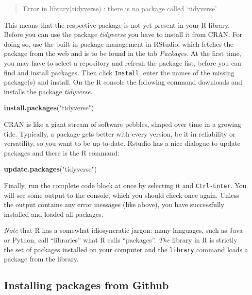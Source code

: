 \documentclass[]{svmono}
\newenvironment{Shaded}{\begin{snugshade}}{\end{snugshade}}
\newcommand{\KeywordTok}[1]{\textcolor[rgb]{0.13,0.29,0.53}{\textbf{#1}}}
\newcommand{\StringTok}[1]{\textcolor[rgb]{0.31,0.60,0.02}{#1}}
\newcommand{\NormalTok}[1]{#1}
\theoremstyle{definition}
\theoremstyle{definition}
\theoremstyle{definition}
\theoremstyle{remark}
\begin{document}
\begin{quote}
Error in library(tidyverse) : there is no package called `tidyverse'
\end{quote}

This means that the respective package is not yet present in your R
library. Before you can use the package \emph{tidyverse} you have to
install it from CRAN. For doing so, use the built-in package management
in RStudio, which fetches the package from the web and is to be found in
the tab \emph{Packages}. At the first time, you may have to select a
repository and refresh the package list, before you can find and install
packages. Then click \texttt{Install}, enter the names of the missing
package(s) and install. On the R console the following command downloads
and installs the package \emph{tidyverse}.

\begin{Shaded}
\begin{Highlighting}[]
\KeywordTok{install.packages}\NormalTok{(}\StringTok{"tidyverse"}\NormalTok{)}
\end{Highlighting}
\end{Shaded}

CRAN is like a giant stream of software pebbles, shaped over time in a
growing tide. Typically, a package gets better with every version, be it
in reliability or versatility, so you want to be up-to-date. Rstudio has
a nice dialogue to update packages and there is the R command:

\begin{Shaded}
\begin{Highlighting}[]
\KeywordTok{update.packages}\NormalTok{(}\StringTok{"tidyverse"}\NormalTok{)}
\end{Highlighting}
\end{Shaded}

Finally, run the complete code block at once by selecting it and
\texttt{Ctrl-Enter}. You will see some output to the console, which you
should check once again. Unless the output contains any error messages
(like above), you have successfully installed and loaded all packages.

\emph{Note} that R has a somewhat idiosyncratic jargon: many languages,
such as Java or Python, call ``libraries'' what R calls ``packages''.
\emph{The} library in R is strictly the set of packages installed on
your computer and the \texttt{library} command loads a package from the
library.

\subsection{Installing packages from
Github}\label{installing-packages-from-github}
\end{document}
